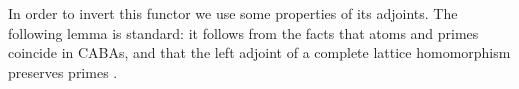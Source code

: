 \documentclass[a4paper,UKenglish,cleveref, autoref]{lipics-v2021}
\begin{document}
In order to invert this functor we use some properties of its adjoints. The
following lemma is standard: it follows from the facts that atoms and primes
coincide in CABAs, and that the left adjoint of a complete lattice
homomorphism preserves primes \cite[Lemma 1.23 and Exercise 1.3.10.e]{gehrke_2024}.



\end{document}
